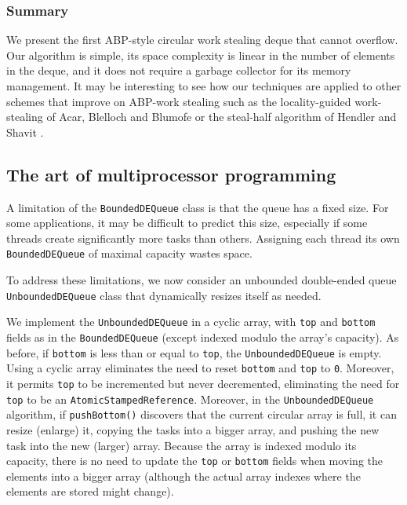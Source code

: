 \subsubsection{Summary}

We present the first ABP-style circular work stealing deque that
cannot overflow. Our algorithm is simple, its space complexity is
linear in the number of elements in the deque, and it does not require
a garbage collector for its memory management. It may be interesting
to see how our techniques are applied to other schemes that improve on
ABP-work stealing such as the locality-guided work-stealing of Acar,
Blelloch and Blumofe \cite{Acar2002} or the steal-half algorithm of
Hendler and Shavit \cite{Hendler2002}.

\subsection{The art of multiprocessor programming \cite{Herlihy2008}}

A limitation of the \lstinline!BoundedDEQueue! class is that the queue
has a fixed size. For some applications, it may be difficult to
predict this size, especially if some threads create significantly
more tasks than others. Assigning each thread its own
\lstinline!BoundedDEQueue! of maximal capacity wastes space.

To address these limitations, we now consider an unbounded
double-ended queue \lstinline!UnboundedDEQueue! class that dynamically
resizes itself as needed.

We implement the \lstinline!UnboundedDEQueue! in a cyclic array, with
\lstinline!top! and \lstinline!bottom! fields as in the
\lstinline!BoundedDEQueue! (except indexed modulo the array's
capacity). As before, if \lstinline!bottom! is less than or equal to
\lstinline!top!, the \lstinline!UnboundedDEQueue! is empty. Using a
cyclic array eliminates the need to reset \lstinline!bottom! and
\lstinline!top! to \lstinline!0!. Moreover, it permits \lstinline!top!
to be incremented but never decremented, eliminating the need for
\lstinline!top! to be an \lstinline!AtomicStampedReference!. Moreover,
in the \lstinline!UnboundedDEQueue! algorithm, if
\lstinline!pushBottom()! discovers that the current circular array is
full, it can resize (enlarge) it, copying the tasks into a bigger
array, and pushing the new task into the new (larger) array. Because
the array is indexed modulo its capacity, there is no need to update
the \lstinline!top! or \lstinline!bottom! fields when moving the
elements into a bigger array (although the actual array indexes where
the elements are stored might change).

